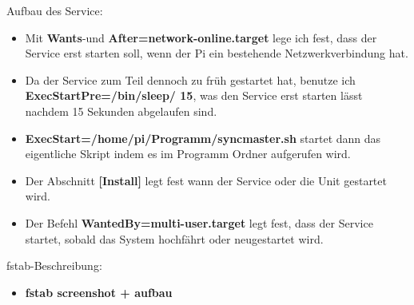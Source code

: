 \documentclass{article}
\begin{document}
Aufbau des Service:
\begin{itemize}  
\item Mit \textbf{Wants}-und \textbf{After=network-online.target} lege ich fest, dass der Service erst starten soll, wenn der Pi ein bestehende Netzwerkverbindung hat.
\item Da der Service zum Teil dennoch zu früh gestartet hat, benutze ich \textbf{ExecStartPre=/bin/sleep/ 15}, was den Service erst starten lässt nachdem 15 Sekunden abgelaufen sind.
\item \textbf{ExecStart=/home/pi/Programm/syncmaster.sh} startet dann das eigentliche Skript indem es im Programm Ordner aufgerufen wird.
\item Der Abschnitt \textbf{[Install]} legt fest wann der Service oder die Unit gestartet wird. 
\item Der Befehl \textbf{WantedBy=multi-user.target} legt fest, dass der Service startet, sobald das System hochfährt oder neugestartet wird.
\end{itemize}

fstab-Beschreibung:
\begin{itemize}
\item \textbf{fstab screenshot + aufbau}
\end{itemize}
\end{document}

